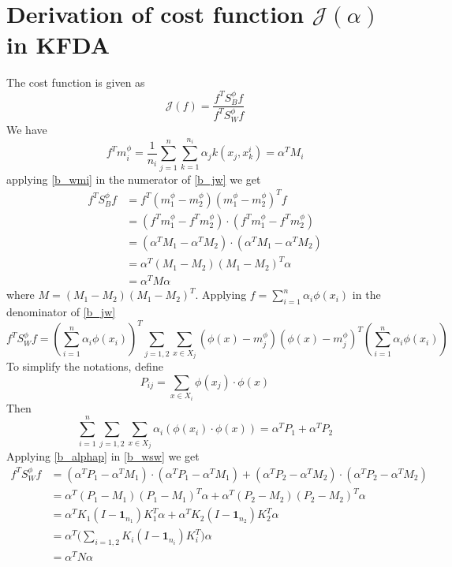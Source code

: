 \chapter{Derivation of cost function $\mathcal{J}(\alpha)$ in KFDA}
\label{derivation2}
The cost function is given as
\begin{equation}
\mathcal{J}(f) = \frac{f^TS_B^{\phi}f}{f^TS_W^{\phi}f} 
\label{b_jw}
\end{equation}
We have
\begin{equation}
f^Tm_i^{\phi} = \frac{1}{n_i} \sum_{j=1}^n \sum_{k=1}^{n_i} \alpha_j k(x_j, x_k^i) = \alpha^T M_i
\label{b_wmi}
\end{equation}
applying \ref{b_wmi} in the numerator of \ref{b_jw} we get
\begin{equation*}
\begin{aligned}
f^TS_B^{\phi}f &= f^T(m_1^{\phi} - m_2^{\phi})(m_1^{\phi} - m_2^{\phi})^Tf \\
&= (f^T m_1^{\phi}-f^Tm_2^{\phi}) \cdot (f^Tm_1^{\phi}-f^Tm_2^{\phi}) \\
&= (\alpha^T M_1 - \alpha^T M_2) \cdot (\alpha^T M_1 - \alpha^T M_2) \\
&= \alpha^T (M_1 - M_2)(M_1 - M_2)^T \alpha \\
&= \alpha^T M \alpha
\end{aligned}
\end{equation*}
where $M = (M_1-M_2)(M_1-M_2)^T$. Applying $f = \sum_{i=1}^n \alpha_i \phi(x_i)$ in the denominator of \ref{b_jw}
\begin{equation}
f^TS_W^{\phi}f = (\sum_{i=1}^n \alpha_i \phi(x_i))^T \sum_{j=1,2} \sum_{x \in X_j} (\phi(x)-m_j^{\phi})(\phi(x)-m_j^{\phi})^T (\sum_{i=1}^n \alpha_i \phi(x_i))
\label{b_wsw}
\end{equation}
To simplify the notations, define
\[ P_{ij} =  \sum_{x \in X_i} \phi(x_j) \cdot \phi(x) \]
Then 
\begin{equation}
\sum_{i=1}^n \sum_{j=1,2} \sum_{x \in X_j} \alpha_i(\phi(x_i) \cdot \phi(x)) = \alpha^TP_1 + \alpha^T P_2
\label{b_alphap}
\end{equation}
Applying \ref{b_alphap} in \ref{b_wsw} we get
\begin{equation*}
\begin{aligned}
f^TS_W^{\phi}f &= (\alpha^T P_1 - \alpha^T M_1) \cdot (\alpha^T P_1 - \alpha^T M_1) + (\alpha^T P_2 - \alpha^T M_2) \cdot (\alpha^T P_2 - \alpha^T M_2) \\
&= \alpha^T(P_1-M_1)(P_1-M_1)^T \alpha + \alpha^T(P_2-M_2)(P_2-M_2)^T \alpha \\
&= \alpha^T K_1(I - \bm{1}_{n_1})K_1^T \alpha + \alpha^T K_2(I - \bm{1}_{n_2})K_2^T \alpha \\
&= \alpha^T \Big(\sum_{i=1,2} K_i(I - \bm{1}_{n_i})K_i^T \Big) \alpha \\
&= \alpha^T N \alpha
\end{aligned}
\end{equation*}

